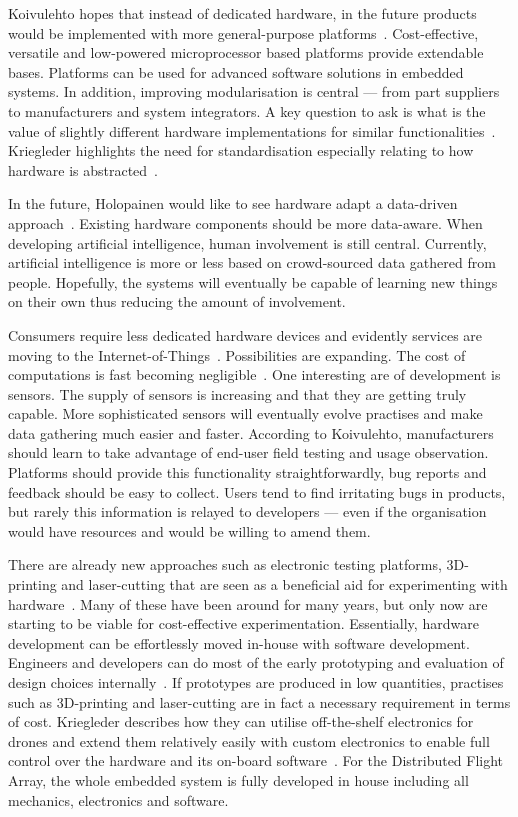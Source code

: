 \documentclass[english]{tktltiki2}
\begin{document}
Koivulehto hopes that instead of dedicated hardware, in the future products would be implemented with more general-purpose platforms~\cite{Koi15}. Cost-effective, versatile and low-powered microprocessor based platforms provide extendable bases. Platforms can be used for advanced software solutions in embedded systems. In addition, improving modularisation is central — from part suppliers to manufacturers and system integrators. A key question to ask is what is the value of slightly different hardware implementations for similar functionalities~\cite{Koi15}. Kriegleder highlights the need for standardisation especially relating to how hardware is abstracted~\cite{Kri15}.

In the future, Holopainen would like to see hardware adapt a data-driven approach~\cite{Hol15a}. Existing hardware components should be more data-aware. When developing artificial intelligence, human involvement is still central. Currently, artificial intelligence is more or less based on crowd-sourced data gathered from people. Hopefully, the systems will eventually be capable of learning new things on their own thus reducing the amount of involvement.

Consumers require less dedicated hardware devices and evidently services are moving to the Internet-of-Things~\cite{Koi15}. Possibilities are expanding. The cost of computations is fast becoming negligible~\cite{Hol15a}. One interesting are of development is sensors. The supply of sensors is increasing and that they are getting truly capable. More sophisticated sensors will eventually evolve practises and make data gathering much easier and faster. According to Koivulehto, manufacturers should learn to take advantage of end-user field testing and usage observation. Platforms should provide this functionality straightforwardly, bug reports and feedback should be easy to collect. Users tend to find irritating bugs in products, but rarely this information is relayed to developers — even if the organisation would have resources and would be willing to amend them.

There are already new approaches such as electronic testing platforms, 3D-printing and laser-cutting that are seen as a beneficial aid for experimenting with hardware~\cite{Kri15}. Many of these have been around for many years, but only now are starting to be viable for cost-effective experimentation. Essentially, hardware development can be effortlessly moved in-house with software development. Engineers and developers can do most of the early prototyping and evaluation of design choices internally~\cite{Kri15}. If prototypes are produced in low quantities, practises such as 3D-printing and laser-cutting are in fact a necessary requirement in terms of cost. Kriegleder describes how they can utilise off-the-shelf electronics for drones and extend them relatively easily with custom electronics to enable full control over the hardware and its on-board software~\cite{Kri15}. For the Distributed Flight Array, the whole embedded system is fully developed in house including all mechanics, electronics and software.
\end{document}
